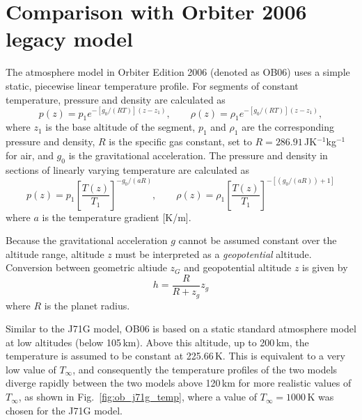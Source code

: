 \documentclass[a4paper]{article}
\begin{document}
\section{Comparison with Orbiter 2006 legacy model}
The atmosphere model in Orbiter Edition 2006 (denoted as OB06) uses a simple static, piecewise linear temperature profile. For segments of constant temperature, pressure and density are calculated as
\begin{equation}
p(z)=p_1 e^{-[g_0/(RT)](z-z_1)}, \qquad \rho(z)=\rho_1 e^{-[g_0/(RT)](z-z_1)},
\end{equation}
where $z_1$ is the base altitude of the segment, $p_1$ and $\rho_1$ are the corresponding pressure and density, $R$ is the specific gas constant, set to $R=286.91$\,JK$^{-1}$kg$^{-1}$ for air, and $g_0$ is the gravitational acceleration.
The pressure and density in sections of linearly varying temperature are calculated as
\begin{equation}
p(z)=p_1\left[\frac{T(z)}{T_1}\right]^{-g_0/(aR)},\qquad
\rho(z)=\rho_1\left[\frac{T(z)}{T_1}\right]^{-[(g_0/(aR))+1]}
\end{equation}
where $a$ is the temperature gradient [K/m].

Because the gravitational acceleration $g$ cannot be assumed constant over the altitude range, altitude $z$ must be interpreted as a \emph{geopotential} altitude. Conversion between geometric altiude $z_G$ and geopotential altitude $z$ is given by
\begin{equation}
h = \frac{R}{R+z_g}z_g
\end{equation}
where $R$ is the planet radius.

Similar to the J71G model, OB06 is based on a static standard atmosphere model at low altitudes (below 105\,km). Above this altitude, up to 200\,km, the temperature is assumed to be constant at 225.66\,K. This is equivalent to a very low value of $T_\infty$, and consequently the temperature profiles of the two models diverge rapidly between the two models above 120\,km for more realistic values of $T_\infty$, as shown in Fig.~\ref{fig:ob_j71g_temp}, where a value of $T_\infty=1000$\,K was chosen for the J71G model.
\end{document}
